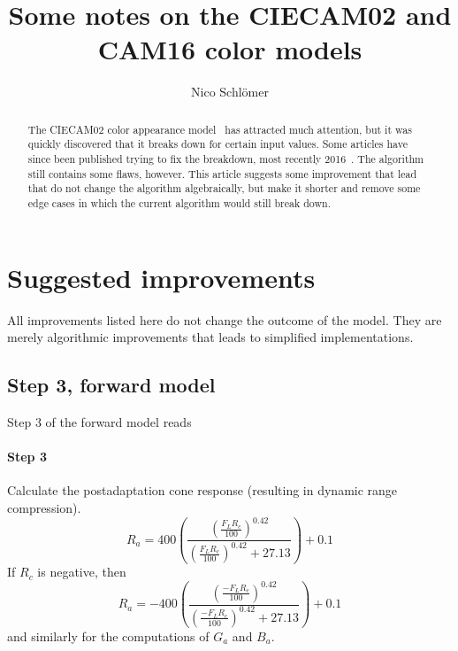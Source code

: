 \documentclass[twocolumn]{scrartcl}
\title{Some notes on the CIECAM02 and CAM16 color models}
\author{Nico Schlömer}
\begin{document}
\maketitle
\begin{abstract}
  The CIECAM02 color appearance model~\cite{ciecam02} has attracted much
  attention, but it was quickly discovered that it breaks down for certain
  input values. Some articles have since been published trying to fix the
  breakdown, most recently 2016~\cite{cam16}. The algorithm still contains some
  flaws, however. This article suggests some improvement that lead that do not
  change the algorithm algebraically, but make it shorter and remove some edge
  cases in which the current algorithm would still break down.
\end{abstract}


%
%
%

\section{Suggested improvements}

All improvements listed here do not change the outcome of the model.  They are
merely algorithmic improvements that leads to simplified implementations.

\subsection{Step 3, forward model}

Step 3 of the forward model reads

\paragraph{Step 3}{%
Calculate the postadaptation cone response
(resulting in dynamic range compression).
\[
  R_a = 400 \left(\frac{\left(\frac{F_L R_c}{100}\right)^{0.42}}{\left(\frac{F_L R_c}{100}\right)^{0.42} + 27.13}\right) + 0.1
\]
If $R_c$ is negative, then
\[
  R_a = -400 \left(\frac{\left(\frac{-F_L R_c}{100}\right)^{0.42}}{\left(\frac{-F_L R_c}{100}\right)^{0.42} + 27.13}\right) + 0.1
\]
and similarly for the computations of $G_a$ and $B_a$.
}
\end{document}
